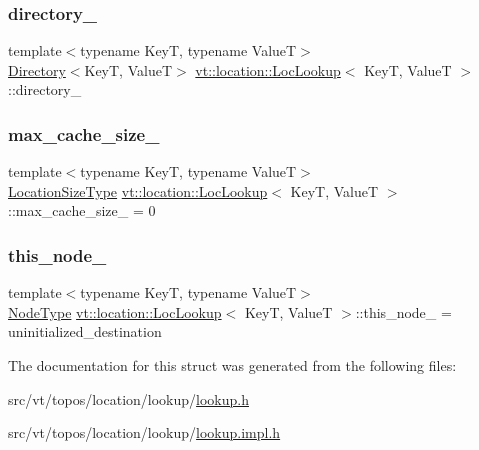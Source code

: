 \subsubsection{\texorpdfstring{directory\+\_\+}{directory\_}}
{\footnotesize\ttfamily template$<$typename KeyT, typename ValueT$>$ \\
\hyperlink{structvt_1_1location_1_1_directory}{Directory}$<$KeyT, ValueT$>$ \hyperlink{structvt_1_1location_1_1_loc_lookup}{vt\+::location\+::\+Loc\+Lookup}$<$ KeyT, ValueT $>$\+::directory\+\_\+\hspace{0.3cm}{\ttfamily [private]}}

\mbox{\label{structvt_1_1location_1_1_loc_lookup_a2eea8b65ba775e30bfbe0bb1e2c0ea65}} 
\subsubsection{\texorpdfstring{max\+\_\+cache\+\_\+size\+\_\+}{max\_cache\_size\_}}
{\footnotesize\ttfamily template$<$typename KeyT, typename ValueT$>$ \\
\hyperlink{namespacevt_1_1location_ab1c4c5849012a23eee2fbd1fce6159d7}{Location\+Size\+Type} \hyperlink{structvt_1_1location_1_1_loc_lookup}{vt\+::location\+::\+Loc\+Lookup}$<$ KeyT, ValueT $>$\+::max\+\_\+cache\+\_\+size\+\_\+ = 0\hspace{0.3cm}{\ttfamily [private]}}

\mbox{\label{structvt_1_1location_1_1_loc_lookup_aabefd8811a180654fc5b1fba649f32b2}} 
\subsubsection{\texorpdfstring{this\+\_\+node\+\_\+}{this\_node\_}}
{\footnotesize\ttfamily template$<$typename KeyT, typename ValueT$>$ \\
\hyperlink{namespacevt_a866da9d0efc19c0a1ce79e9e492f47e2}{Node\+Type} \hyperlink{structvt_1_1location_1_1_loc_lookup}{vt\+::location\+::\+Loc\+Lookup}$<$ KeyT, ValueT $>$\+::this\+\_\+node\+\_\+ = uninitialized\+\_\+destination\hspace{0.3cm}{\ttfamily [private]}}



The documentation for this struct was generated from the following files\+:\begin{DoxyCompactItemize}
\item 
src/vt/topos/location/lookup/\hyperlink{lookup_8h}{lookup.\+h}\item 
src/vt/topos/location/lookup/\hyperlink{lookup_8impl_8h}{lookup.\+impl.\+h}\end{DoxyCompactItemize}
